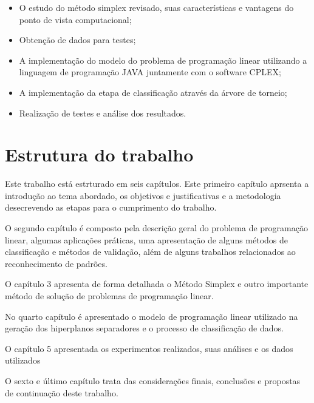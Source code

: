 \begin{itemize} 
\item O estudo do método simplex revisado, suas características e vantagens do ponto de vista computacional;
\item Obtenção de dados para testes;
\item A implementação do modelo do problema de programação linear utilizando a linguagem de programação JAVA juntamente com o software CPLEX;
\item A implementação da etapa de classificação através da árvore de torneio;
\item Realização de testes e análise dos resultados.
\end{itemize}

\section{Estrutura do trabalho}
Este trabalho está estrturado em seis capítulos. Este primeiro capítulo aprsenta a introdução ao tema abordado, os objetivos e justificativas e a metodologia desecrevendo as etapas para o cumprimento do trabalho.

O segundo capítulo é composto pela descrição geral do problema de programação linear, algumas aplicações práticas, uma apresentação de alguns métodos de classificação e métodos de validação, além de alguns trabalhos relacionados ao reconhecimento de padrões.

O capítulo 3 apresenta de forma detalhada o Método Simplex e outro importante método de solução de problemas de programação linear.

No quarto capítulo é apresentado o modelo de programação linear utilizado na geração dos hiperplanos separadores e o processo de classificação de dados.

O capítulo 5 apresentada os experimentos realizados, suas análises e os dados utilizados

O sexto e último capítulo trata das considerações finais, conclusões e propostas de continuação deste trabalho.

